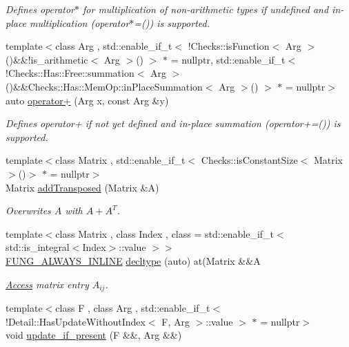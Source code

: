 \begin{DoxyCompactItemize}
\begin{DoxyCompactList}\small\item\em \-Defines operator$\ast$ for multiplication of non-\/arithmetic types if undefined and in-\/place multiplication (operator$\ast$=()) is supported. \end{DoxyCompactList}\item 
{\footnotesize template$<$class Arg , std\-::enable\-\_\-if\-\_\-t$<$ !\-Checks\-::is\-Function$<$ Arg $>$()\&\&!is\-\_\-arithmetic$<$ Arg $>$() $>$ $\ast$  = nullptr, std\-::enable\-\_\-if\-\_\-t$<$ !\-Checks\-::\-Has\-::\-Free\-::summation$<$ Arg $>$()\&\&\-Checks\-::\-Has\-::\-Mem\-Op\-::in\-Place\-Summation$<$ Arg $>$() $>$ $\ast$  = nullptr$>$ }\\auto \hyperlink{namespaceFunG_a063d3e8c19dbea3ee1396736fecb64e1}{operator+} (\-Arg x, const \-Arg \&y)
\begin{DoxyCompactList}\small\item\em \-Defines operator+ if not yet defined and in-\/place summation (operator+=()) is supported. \end{DoxyCompactList}\item 
{\footnotesize template$<$class Matrix , std\-::enable\-\_\-if\-\_\-t$<$ Checks\-::is\-Constant\-Size$<$ Matrix $>$()$>$ $\ast$  = nullptr$>$ }\\\-Matrix \hyperlink{namespaceFunG_a0211d0d26c669d56b5113fd2292902e5}{add\-Transposed} (\-Matrix \&\-A)
\begin{DoxyCompactList}\small\item\em \-Overwrites $A$ with $A+A^T$. \end{DoxyCompactList}\item 
{\footnotesize template$<$class Matrix , class Index , class  = std\-::enable\-\_\-if\-\_\-t$<$ std\-::is\-\_\-integral$<$\-Index$>$\-::value $>$$>$ }\\\hyperlink{macros_8hh_a03b9da186125795e5afa49d0ef1cc32f}{\-F\-U\-N\-G\-\_\-\-A\-L\-W\-A\-Y\-S\-\_\-\-I\-N\-L\-I\-N\-E} \hyperlink{namespaceFunG_a008e627afadc16205f1a9f1469af1d76}{decltype} (auto) at(\-Matrix \&\&\-A
\begin{DoxyCompactList}\small\item\em \hyperlink{namespaceFunG_1_1Access}{\-Access} matrix entry $A_{ij}$. \end{DoxyCompactList}\item 
{\footnotesize template$<$class F , class Arg , std\-::enable\-\_\-if\-\_\-t$<$!\-Detail\-::\-Has\-Update\-Without\-Index$<$ F, Arg $>$\-::value $>$ $\ast$  = nullptr$>$ }\\void \hyperlink{namespaceFunG_a3b9d2e5d07b30c2ee26703b33e9adb9e}{update\-\_\-if\-\_\-present} (\-F \&\&, \-Arg \&\&)

\end{DoxyCompactItemize}
